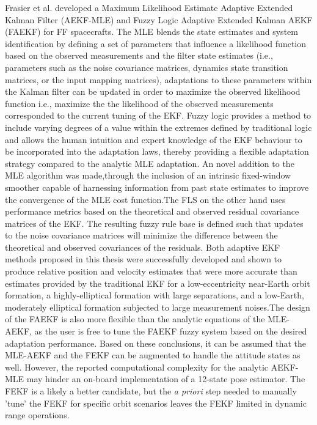 Frasier et al. developed a Maximum Likelihood Estimate Adaptive Extended Kalman Filter (AEKF-MLE) and Fuzzy Logic Adaptive Extended Kalman AEKF (FAEKF) for FF spacecrafts. The MLE blends the state estimates and system identification by defining a set of parameters that influence a likelihood function based on the observed measurements and the filter state estimates (i.e., parameters such as the noise covariance matrices, dynamics state transition matrices, or the input mapping matrices), adaptations to these parameters within the Kalman filter can be updated in order to maximize the observed likelihood function i.e., maximize the the likelihood of the observed measurements corresponded to the current tuning of the EKF. Fuzzy logic provides a method to include varying degrees of a value within the extremes defined by traditional logic and allows the human intuition and expert knowledge of the EKF behaviour to be incorporated into the adaptation laws, thereby providing a flexible adaptation strategy compared to the analytic MLE adaptation. An novel addition to the MLE algorithm was made,through the inclusion of an intrinsic fixed-window smoother capable of harnessing information from past state estimates to improve the convergence of the MLE cost function.The FLS on the other hand uses performance metrics based on the theoretical and observed residual covariance matrices of the EKF. The resulting fuzzy rule base is defined such that updates to the noise covariance matrices will minimize the difference between the theoretical and observed covariances of the residuals. Both adaptive EKF methods proposed in this thesis were successfully developed and shown to produce relative position and velocity estimates that were more accurate than estimates provided by the traditional EKF for a low-eccentricity near-Earth orbit formation, a highly-elliptical formation with large separations, and a low-Earth, moderately elliptical formation subjected to large measurement noises.The design of the FAEKF is also more flexible than the analytic equations of the MLE-AEKF, as the user is free to tune the FAEKF fuzzy system based on the desired adaptation performance. Based on these conclusions, it can be assumed that the MLE-AEKF and the FEKF can be augmented to handle the attitude states as well. However, the reported computational complexity for the analytic AEKF-MLE may hinder an on-board implementation of a 12-state pose estimator. The FEKF is a likely a better candidate, but the \textit{a priori} step needed to manually 'tune' the FEKF for specific orbit scenarios leaves the FEKF limited in dynamic range operations.

